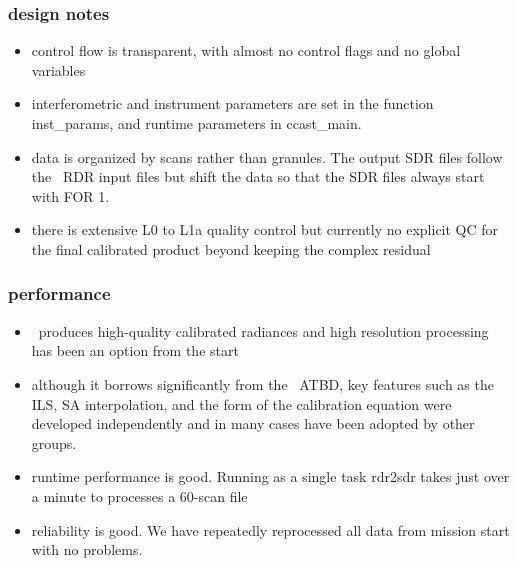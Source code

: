 \documentclass[11pt]{beamer}
\begin{document}
\begin{frame}
\frametitle{design notes}

\begin{itemize}

  \item control flow is transparent, with almost no control flags
    and no global variables

  \item interferometric and instrument parameters are set in the
    function inst\_params, and runtime parameters in ccast\_main.

  \item data is organized by scans rather than granules.  The output
    SDR files follow the \noaa\ RDR input files but shift the data
    so that the SDR files always start with FOR 1.
   
  \item there is extensive L0 to L1a quality control but currently
    no explicit QC for the final calibrated product beyond keeping
    the complex residual

\end{itemize}

\end{frame}
\begin{frame}
\frametitle{performance}

\begin{itemize} 
  \item \ccast\ produces high-quality calibrated radiances and high
    resolution processing has been an option from the start

  \item although it borrows significantly from the \noaa\ ATBD, key
    features such as the ILS, SA interpolation, and the form of the
    calibration equation were developed independently and in many
    cases have been adopted by other groups.

  \item runtime performance is good.  Running as a single task
    rdr2sdr takes just over a minute to processes a 60-scan file

  \item reliability is good.  We have repeatedly reprocessed all
    data from mission start with no problems.

\end{itemize} 

\end{frame}
\end{document}
